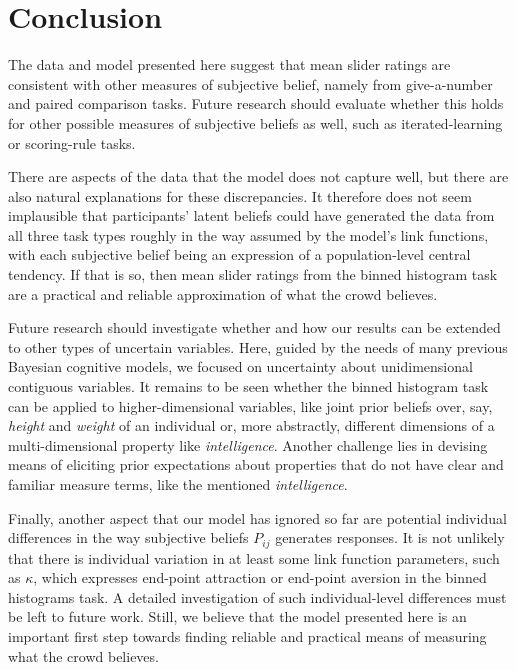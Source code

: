 \documentclass[10pt,letterpaper]{article}
\begin{document}
\section{Conclusion}

The data and model presented here suggest that mean slider ratings are consistent with other
measures of subjective belief, namely from give-a-number and paired comparison tasks. Future
research should evaluate whether this holds for other possible measures of subjective beliefs
as well, such as iterated-learning or scoring-rule tasks. 

There are aspects of the data that the model does not capture well, but there are also natural
explanations for these discrepancies. It therefore does not seem implausible that participants'
latent beliefs could have generated the data from all three task types roughly in the way
assumed by the model's link functions, with each subjective belief being an expression of a
population-level central tendency. If that is so, then mean slider ratings from the binned
histogram task are a practical and reliable approximation of what the crowd believes.

Future research should investigate whether and how our results can be extended to other types
of uncertain variables. Here, guided by the needs of many previous Bayesian cognitive models,
we focused on uncertainty about unidimensional contiguous variables. It remains to be seen
whether the binned histogram task can be applied to higher-dimensional variables, like joint
prior beliefs over, say, \emph{height} and \emph{weight} of an individual or, more abstractly,
different dimensions of a multi-dimensional property like \emph{intelligence}. Another
challenge lies in devising means of eliciting prior expectations about properties that do not
have clear and familiar measure terms, like the mentioned \emph{intelligence}.

Finally, another aspect that our model has ignored so far are potential individual differences
in the way subjective beliefs $P_{ij}$ generates responses. It is not unlikely that there is
individual variation in at least some link function parameters, such as $\kappa$, which
expresses end-point attraction or end-point aversion in the binned histograms task. A detailed
investigation of such individual-level differences must be left to future work. Still, we
believe that the model presented here is an important first step towards finding reliable and
practical means of measuring what the crowd believes.
\end{document}
